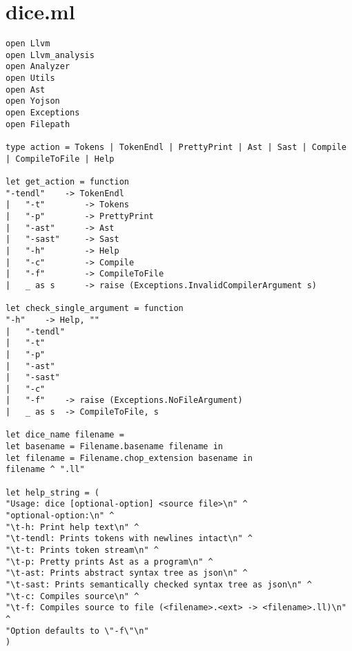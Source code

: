 \section{dice.ml}
\begin{verbatim}
open Llvm
open Llvm_analysis
open Analyzer
open Utils
open Ast
open Yojson
open Exceptions
open Filepath

type action = Tokens | TokenEndl | PrettyPrint | Ast | Sast | Compile | CompileToFile | Help

let get_action = function
"-tendl" 	-> TokenEndl
| 	"-t" 		-> Tokens
| 	"-p" 		-> PrettyPrint
| 	"-ast" 		-> Ast
| 	"-sast" 	-> Sast
| 	"-h" 		-> Help
| 	"-c" 		-> Compile
| 	"-f" 		-> CompileToFile
|  	_ as s		-> raise (Exceptions.InvalidCompilerArgument s)

let check_single_argument = function
"-h" 	-> Help, ""
| 	"-tendl"
| 	"-t" 	
| 	"-p" 	
| 	"-ast" 	
| 	"-sast" 
| 	"-c" 	
| 	"-f" 	-> raise (Exceptions.NoFileArgument)
|  	_ as s 	-> CompileToFile, s

let dice_name filename = 
let basename = Filename.basename filename in
let filename = Filename.chop_extension basename in
filename ^ ".ll"

let help_string = (
"Usage: dice [optional-option] <source file>\n" ^
"optional-option:\n" ^
"\t-h: Print help text\n" ^
"\t-tendl: Prints tokens with newlines intact\n" ^ 
"\t-t: Prints token stream\n" ^
"\t-p: Pretty prints Ast as a program\n" ^
"\t-ast: Prints abstract syntax tree as json\n" ^
"\t-sast: Prints semantically checked syntax tree as json\n" ^
"\t-c: Compiles source\n" ^
"\t-f: Compiles source to file (<filename>.<ext> -> <filename>.ll)\n" ^
"Option defaults to \"-f\"\n"
)


\end{verbatim}
